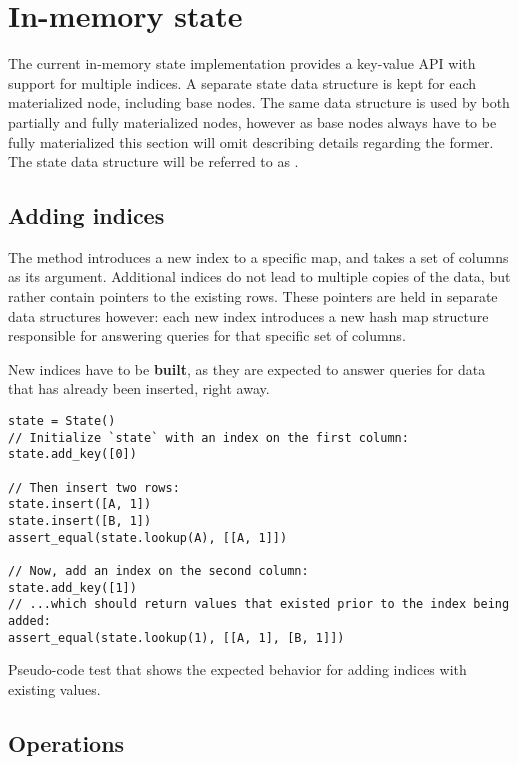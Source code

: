 \newpage

\section{In-memory state}\label{sec:in-memory-state}
The current in-memory state implementation provides a key-value API with support
for multiple indices. A separate state data structure is kept for each
materialized node, including base nodes. The same data structure is used by both
partially and fully materialized nodes, however as base nodes always have to be
fully materialized this section will omit describing details regarding the
former. The state data structure will be referred to as .

\subsection{Adding indices}
The  method introduces a new index to a specific  map,
and takes a set of columns as its argument. Additional indices do not lead to
multiple copies of the data, but rather contain pointers to the existing rows.
These pointers are held in separate data structures however: each new index
introduces a new hash map structure responsible for answering queries for that
specific set of columns.

New indices have to be \textbf{built}, as they are expected to answer queries
for data that has already been inserted, right away.

\begin{listing}[H]
  \begin{verbatim}
state = State()
// Initialize `state` with an index on the first column:
state.add_key([0])

// Then insert two rows:
state.insert([A, 1])
state.insert([B, 1])
assert_equal(state.lookup(A), [[A, 1]])

// Now, add an index on the second column:
state.add_key([1])
// ...which should return values that existed prior to the index being added:
assert_equal(state.lookup(1), [[A, 1], [B, 1]])
  \end{verbatim}

  \caption{Pseudo-code test that shows the expected behavior for adding indices
  with existing values.}\label{lst:existing-index}
\end{listing}

\subsection{Operations}

